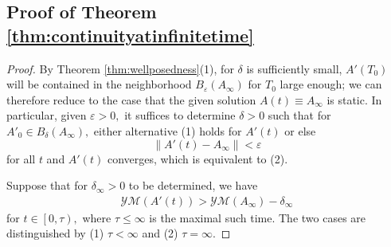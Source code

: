 \documentclass[12pt]{amsart}
\newcommand{\LB}{\left[}
\renewcommand{\1}{{\mathbf 1}}
\newcommand{\eps}{{\varepsilon}}
\theoremstyle{others}
\numberwithin{equation}{section}
\begin{document}
\vspace{5mm}



\subsection{Proof of Theorem \ref{thm:continuityatinfinitetime}} \label{continuityatinftime}
\begin{proof} 
    By Theorem \ref{thm:wellposedness}(1), for $\delta$ is sufficiently small, $A'(T_0)$ will be contained in the neighborhood $B_{\eps}(A_\infty)$ for $T_0$ large enough; we can therefore reduce to the case that the given solution $A(t) \equiv A_\infty$ is static. In particular, given $\eps > 0,$ it suffices to determine $\delta > 0$ such that for $A'_0 \in B_\delta(A_\infty),$ either alternative (1) holds for $A'(t)$ or else
    \begin{equation}\label{alternate(2)}
        \| A'(t) - A_\infty \| < \eps
    \end{equation}
    for all $t$ and $A'(t)$ converges, which is equivalent to (2). 

    Suppose that for \(\delta_\infty > 0\) to be determined, we have
    \begin{align}\label{continuityatinfinitetime:energydoesntdropmuch}
        \mathcal{YM}(A'(t)) > \mathcal{YM}(A_\infty) - \delta_\infty
    \end{align} for $t \in \LB 0 , \tau \right),$ where $\tau \leq \infty$ is the maximal such time. The two cases are distinguished by (1) $\tau < \infty$ and (2) $\tau = \infty.$ %
    


\end{proof}
\end{document}
